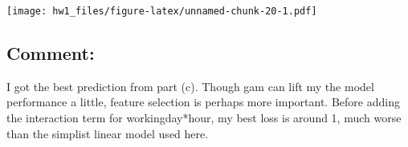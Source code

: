 \documentclass[]{article}
\newenvironment{Shaded}{\begin{snugshade}}{\end{snugshade}}
\newcommand{\KeywordTok}[1]{\textcolor[rgb]{0.13,0.29,0.53}{\textbf{#1}}}
\newcommand{\DataTypeTok}[1]{\textcolor[rgb]{0.13,0.29,0.53}{#1}}
\newcommand{\CharTok}[1]{\textcolor[rgb]{0.31,0.60,0.02}{#1}}
\newcommand{\StringTok}[1]{\textcolor[rgb]{0.31,0.60,0.02}{#1}}
\newcommand{\OtherTok}[1]{\textcolor[rgb]{0.56,0.35,0.01}{#1}}
\newcommand{\OperatorTok}[1]{\textcolor[rgb]{0.81,0.36,0.00}{\textbf{#1}}}
\newcommand{\NormalTok}[1]{#1}
\begin{document}
\texttt{[image: hw1\_files/figure-latex/unnamed-chunk-20-1.pdf]}

\subsection{Comment:}\label{comment-3}

I got the best prediction from part (c). Though gam can lift my the
model performance a little, feature selection is perhaps more important.
Before adding the interaction term for workingday*hour, my best loss is
around 1, much worse than the simplist linear model used here.

\begin{Shaded}
\end{Shaded}
\end{document}
